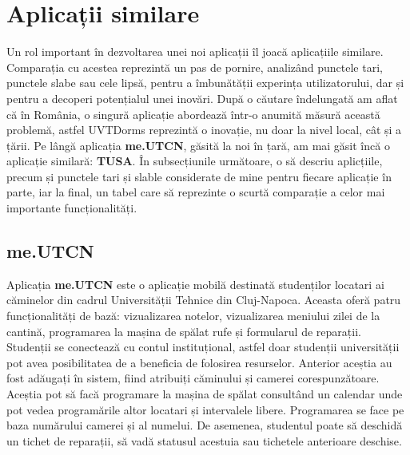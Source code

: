 \documentclass[12pt,a4paper]{report}
\theoremstyle{definition}
\theoremstyle{remark}
\begin{document}
\section{Aplicații similare}
\par Un rol important în dezvoltarea unei noi aplicații îl joacă aplicațiile similare. Comparația cu acestea reprezintă un pas de pornire, analizând punctele tari, punctele slabe sau cele lipsă, pentru a îmbunătății experința utilizatorului, dar și pentru a decoperi potențialul unei inovări. După o căutare îndelungată am aflat că în România, o singură aplicație abordează într-o anumită măsură această problemă, astfel UVTDorms reprezintă o inovație, nu doar la nivel local, cât și a țării. Pe lângă aplicația \textbf{me.UTCN}, găsită la noi în țară, am mai găsit încă o aplicație similară: \textbf{TUSA}.  În subsecțiunile următoare, o să descriu aplicțiile, precum și punctele tari și slable considerate de mine pentru fiecare aplicație în parte, iar la final, un tabel care să reprezinte o scurtă comparație a celor mai importante funcționalități.

\subsection{me.UTCN}
\par Aplicația \textbf{me.UTCN} este o aplicație mobilă destinată studenților locatari ai \textnormal{că\-mi\-ne\-lor}  din cadrul Universității Tehnice din Cluj-Napoca. Aceasta oferă patru \textnormal{func\-ți\-o\-na\-li\-tă\-ți} de bază: vizualizarea notelor, vizualizarea meniului zilei de la cantină, programarea la mașina de spălat rufe și formularul de reparații. Studenții se conectează cu contul instituțional, astfel doar studenții universității pot avea posibilitatea de a beneficia de folosirea resurselor. Anterior aceștia au fost adăugați în sistem, fiind atribuiți căminului și camerei corespunzătoare. Aceștia pot să facă programare la mașina de spălat consultând un calendar unde pot vedea programările altor locatari și intervalele libere. Programarea se face pe baza numărului camerei și al numelui. De asemenea, studentul poate să deschidă un tichet de reparații, să vadă statusul acestuia sau tichetele anterioare deschise.
\end{document}
